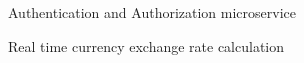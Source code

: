 
\vspace{-5mm}
\begin{cventries}

\cventry
  {} %
  {} %
  {} %
  {} %
  {
    \begin{cvitems} %
      \item Authentication and Authorization microservice
      \item Real time currency exchange rate calculation
    \end{cvitems}
  }

\end{cventries}
